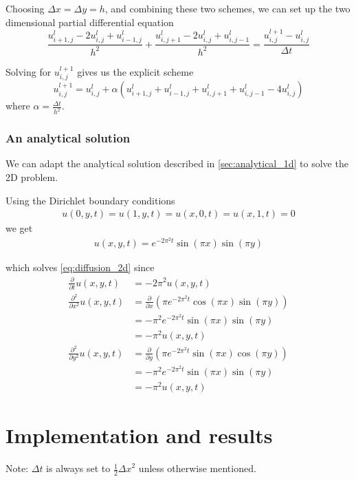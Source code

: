 \documentclass[10pt,a4paper]{article}
\newcommand{\dt}{{\Delta t}}
\newcommand{\dx}{{\Delta x}}
\newcommand{\dy}{{\Delta y}}
\newcommand{\fracpt}{\frac{\partial}{\partial t}}
\newcommand{\fracpx}{\frac{\partial}{\partial x}}
\newcommand{\fracpy}{\frac{\partial}{\partial y}}
\newcommand{\fracpxx}{\frac{\partial^2}{\partial x^2}}
\newcommand{\fracpyy}{\frac{\partial^2}{\partial y^2}}
\begin{document}
Choosing $\dx = \dy = h$, and combining these two schemes, we can set up the two dimensional partial differential equation
\begin{equation}
\frac{u_{i+1,j}^l - 2u_{i,j}^l + u_{i-1,j}^l}{h^2} + \frac{u_{i,j+1}^l - 2u_{i,j}^l + u_{i,j-1}^l}{h^2} = \frac{u_{i,j}^{l+1} - u_{i,j}^l}{\dt}
\end{equation}

Solving for $u_{i,j}^{l+1}$ gives us the explicit scheme
\begin{equation}
u_{i,j}^{l+1} = u_{i,j}^l + \alpha\left( u_{i+1,j}^l + u_{i-1,j}^l + u_{i,j+1}^l + u_{i,j-1}^l - 4u_{i,j}^l \right)
\end{equation}
where $\alpha = \frac{\dt}{h^2}$.


\subsubsection{An analytical solution}
We can adapt the analytical solution described in \vref{sec:analytical_1d} to solve the 2D problem.

Using the Dirichlet boundary conditions
\begin{align}
u(0, y, t) = u(1, y, t) = u(x, 0, t) = u(x, 1, t) = 0
\end{align}
we get
\begin{align}\label{eq:analytical_2d}
    u(x, y, t) = e^{-2\pi^2 t} \sin(\pi x) \sin(\pi y)
\end{align}

which solves \vref{eq:diffusion_2d} since
\begin{align}
\fracpt u(x, y, t) &= -2\pi^2 u(x, y, t) \\
\fracpxx u(x, y, t) &= \fracpx \left( \pi e^{-2\pi^2 t} \cos(\pi x) \sin(\pi y) \right) \\
&= -\pi^2 e^{-2\pi^2 t} \sin(\pi x) \sin(\pi y) \\
&= -\pi^2 u(x, y, t) \\
\fracpyy u(x, y, t) &= \fracpy \left( \pi e^{-2\pi^2 t} \sin(\pi x) \cos(\pi y) \right) \\
&= -\pi^2 e^{-2\pi^2 t} \sin(\pi x) \sin(\pi y) \\
&= -\pi^2 u(x, y, t)
\end{align}

\section{Implementation and results}\label{sec:implementation_and_results}
Note: $\dt$ is always set to $\frac{1}{2}\dx^2$ unless otherwise mentioned.\\\\
\end{document}
